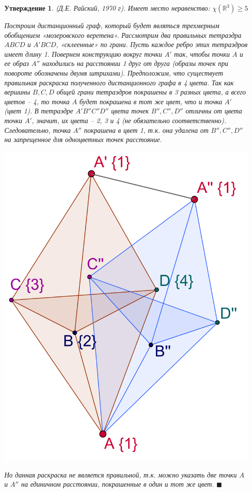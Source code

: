 \documentclass{report}%
\newtheorem{claim}[theorem]{Утверждение}
\newenvironment{proof}{\par\noindent{\bf Доказательство.}}{\hfill$\scriptstyle\blacksquare$}
\begin{document}
\begin{claim} (Д.Е. Райский, 1970 г).
		Имеет место неравенство: $\chi(\mathbb{R}^3) \geq 5$ \\
		\begin{proof}
				Построим дистанционный граф, который будет являться трехмерным обобщением «мозеровского веретена». 
				Рассмотрим два правильных 	тетраэдра $ABCD$ и $A'BCD$, «склеенные» по грани.
				Пусть каждое ребро этих тетраэдров имеет длину 1. Повернем конструкцию вокруг точки $A'$ так,
				чтобы точки $A$ и ее образ $A''$ находились на расстоянии 1 друг от друга
				(образы точек при повороте обозначены двумя штрихами). Предположим, что существует
				правильная раскраска полученного дистанционного графа в 4 цвета. Так как вершины $B, C, D$
				общей грани тетраэдров покрашены в 3 разных цвета, а всего цветов – 4,
				то точка $A$ будет покрашена в тот же цвет, что и точка $A'$ (цвет {1}).
				В тетраэдре $A'B''C''D''$ цвета точек $B'', C'', D''$ отличны от цвета точки $A'$,
				значит, их цвета –  {2}, {3} и {4} (не обязательно соответственно).
				Следовательно, точка $A''$ покрашена в цвет {1}, т.к. она удалена от $B'',C'',D''$
				на запрещенное для одноцветных точек расстояние. \\
			\begin{center}
					\includegraphics[scale = 0.25]{raisky}
			\end{center}
			
			Но данная раскраска не является правильной, т.к. можно указать две точки $A$ и $A''$
			на единичном расстоянии, покрашенные в один и тот же цвет. 	
		\end{proof}
\end{claim}
\end{document}
